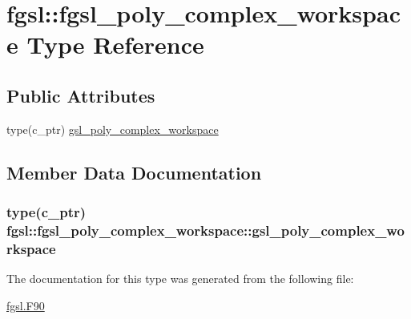 \hypertarget{structfgsl_1_1fgsl__poly__complex__workspace}{}\section{fgsl\+:\+:fgsl\+\_\+poly\+\_\+complex\+\_\+workspace Type Reference}
\label{structfgsl_1_1fgsl__poly__complex__workspace}
\subsection*{Public Attributes}
\begin{DoxyCompactItemize}
\item 
type(c\+\_\+ptr) \hyperlink{structfgsl_1_1fgsl__poly__complex__workspace_acd18b68a12097cd989a920a15105cd6a}{gsl\+\_\+poly\+\_\+complex\+\_\+workspace}
\end{DoxyCompactItemize}


\subsection{Member Data Documentation}
\hypertarget{structfgsl_1_1fgsl__poly__complex__workspace_acd18b68a12097cd989a920a15105cd6a}{}
\subsubsection[{gsl\+\_\+poly\+\_\+complex\+\_\+workspace}]{\setlength{\rightskip}{0pt plus 5cm}type(c\+\_\+ptr) fgsl\+::fgsl\+\_\+poly\+\_\+complex\+\_\+workspace\+::gsl\+\_\+poly\+\_\+complex\+\_\+workspace}\label{structfgsl_1_1fgsl__poly__complex__workspace_acd18b68a12097cd989a920a15105cd6a}


The documentation for this type was generated from the following file\+:\begin{DoxyCompactItemize}
\item 
\hyperlink{fgsl_8F90}{fgsl.\+F90}\end{DoxyCompactItemize}
